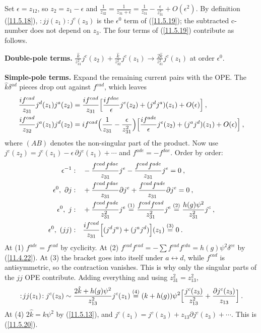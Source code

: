 \begin{tcolorbox}[breakable]
	\begin{remark}
		Set $\epsilon=z_{12}$, so $z_{2}=z_{1}-\epsilon$ and $\frac{1}{z_{32}}=\frac{1}{z_{31}+\epsilon}=\frac{1}{z_{31}}-\frac{\epsilon}{z_{31}^{2}}+O(\epsilon^{2})$. By definition (\ref{11.5.18}), $:\!jj(z_{1})\!:j^{c}(z_{3})$ is the $\epsilon^{0}$ term of (\ref{11.5.19}); the subtracted c-number does not depend on $z_{3}$. The four terms of (\ref{11.5.19}) contribute as follows.

		\textbf{Double-pole terms.} $\frac{\hat{k}}{z_{31}^{2}}j^{c}(z_{2})+\frac{\hat{k}}{z_{32}^{2}}j^{c}(z_{1})\to\frac{2\hat{k}}{z_{31}^{2}}j^{c}(z_{1})$ at order $\epsilon^{0}$.

		\textbf{Simple-pole terms.} Expand the remaining current pairs with the OPE. The $\hat{k}\delta^{ad}$ pieces drop out against $f^{cad}$, which leaves
		\begin{align*}
			\frac{i f^{cad}}{z_{31}}j^{d}(z_{1})j^{a}(z_{2})&=\frac{i f^{cad}}{z_{31}}\Bigl[\frac{i f^{dae}}{\epsilon}j^{e}(z_{2})+(j^{d}j^{a})(z_{1})+O(\epsilon)\Bigr]\:,\\
			\frac{i f^{cad}}{z_{32}}j^{a}(z_{1})j^{d}(z_{2})&=i f^{cad}\Bigl(\frac{1}{z_{31}}-\frac{\epsilon}{z_{31}^{2}}\Bigr)\Bigl[\frac{i f^{ade}}{\epsilon}j^{e}(z_{2})+(j^{a}j^{d})(z_{1})+O(\epsilon)\Bigr]\:,
		\end{align*}
		where $(AB)$ denotes the non-singular part of the product. Now use $j^{e}(z_{2})=j^{e}(z_{1})-\epsilon\,\partial j^{e}(z_{1})+\cdots$ and $f^{ade}=-f^{dae}$. Order by order:
		\begin{align*}
			\epsilon^{-1}:&\quad -\frac{f^{cad}f^{dae}}{z_{31}}j^{e}-\frac{f^{cad}f^{ade}}{z_{31}}j^{e}=0\:,\\
			\epsilon^{0},\ \partial j:&\quad +\frac{f^{cad}f^{dae}}{z_{31}}\partial j^{e}+\frac{f^{cad}f^{ade}}{z_{31}}\partial j^{e}=0\:,\\
			\epsilon^{0},\ j:&\quad +\frac{f^{cad}f^{ade}}{z_{31}^{2}}j^{e}\overset{(1)}{=}\frac{f^{cad}f^{ead}}{z_{31}^{2}}j^{e}\overset{(2)}{=}\frac{h(g)\psi^{2}}{z_{31}^{2}}j^{c}\:,\\
			\epsilon^{0},\ (jj):&\quad \frac{i f^{cad}}{z_{31}}\Bigl[(j^{d}j^{a})+(j^{a}j^{d})\Bigr](z_{1})\overset{(3)}{=}0\:.
		\end{align*}
		At (1) $f^{ade}=f^{ead}$ by cyclicity. At (2) $f^{cad}f^{ead}=-\sum f^{cad}f^{eda}=h(g)\psi^{2}\delta^{ce}$ by (\ref{11.4.22}). At (3) the bracket goes into itself under $a\leftrightarrow d$, while $f^{cad}$ is antisymmetric, so the contraction vanishes. This is why only the singular parts of the $jj$ OPE contribute. Adding everything and using $z_{31}^{2}=z_{13}^{2}$,
		\begin{equation*}
			:\!jj(z_{1})\!:j^{c}(z_{3})\sim\frac{2\hat{k}+h(g)\psi^{2}}{z_{13}^{2}}j^{c}(z_{1})
			\overset{(4)}{=}(k+h(g))\psi^{2}\Bigl[\frac{j^{c}(z_{3})}{z_{13}^{2}}+\frac{\partial j^{c}(z_{3})}{z_{13}}\Bigr]\:.
		\end{equation*}
		At (4) $2\hat{k}=k\psi^{2}$ by (\ref{11.5.13}), and $j^{c}(z_{1})=j^{c}(z_{3})+z_{13}\partial j^{c}(z_{3})+\cdots$. This is (\ref{11.5.20}).
	\end{remark}
\end{tcolorbox}
